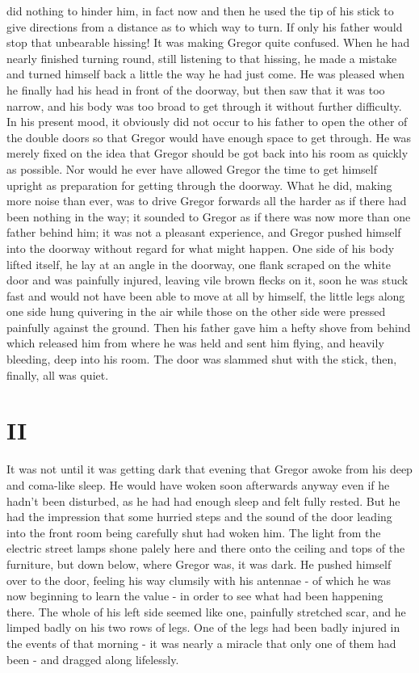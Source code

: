 \documentclass[12pt]{report}
\newcommand{\mychapter}[2]{
\setcounter{chapter}{#1}
    \setcounter{section}{0}
    \chapter*{#2}
    \addcontentsline{toc}{chapter}{#2}
}
\begin{document}
did nothing to hinder him, in fact now and then he used the tip of his
stick to give directions from a distance as to which way to turn. If
only his father would stop that unbearable hissing! It was making Gregor
quite confused. When he had nearly finished turning round, still
listening to that hissing, he made a mistake and turned himself back a
little the way he had just come. He was pleased when he finally had his
head in front of the doorway, but then saw that it was too narrow, and
his body was too broad to get through it without further difficulty. In
his present mood, it obviously did not occur to his father to open the
other of the double doors so that Gregor would have enough space to get
through. He was merely fixed on the idea that Gregor should be got back
into his room as quickly as possible. Nor would he ever have allowed
Gregor the time to get himself upright as preparation for getting
through the doorway. What he did, making more noise than ever, was to
drive Gregor forwards all the harder as if there had been nothing in the
way; it sounded to Gregor as if there was now more than one father
behind him; it was not a pleasant experience, and Gregor pushed himself
into the doorway without regard for what might happen. One side of his
body lifted itself, he lay at an angle in the doorway, one flank scraped
on the white door and was painfully injured, leaving vile brown flecks
on it, soon he was stuck fast and would not have been able to move at
all by himself, the little legs along one side hung quivering in the air
while those on the other side were pressed painfully against the ground.
Then his father gave him a hefty shove from behind which released him
from where he was held and sent him flying, and heavily bleeding, deep
into his room. The door was slammed shut with the stick, then, finally,
all was quiet.

\mychapter{2}{II}\label{ii}

It was not until it was getting dark that evening that Gregor awoke from
his deep and coma-like sleep. He would have woken soon afterwards anyway
even if he hadn't been disturbed, as he had had enough sleep and felt
fully rested. But he had the impression that some hurried steps and the
sound of the door leading into the front room being carefully shut had
woken him. The light from the electric street lamps shone palely here
and there onto the ceiling and tops of the furniture, but down below,
where Gregor was, it was dark. He pushed himself over to the door,
feeling his way clumsily with his antennae - of which he was now
beginning to learn the value - in order to see what had been happening
there. The whole of his left side seemed like one, painfully stretched
scar, and he limped badly on his two rows of legs. One of the legs had
been badly injured in the events of that morning - it was nearly a
miracle that only one of them had been - and dragged along lifelessly.
\end{document}
